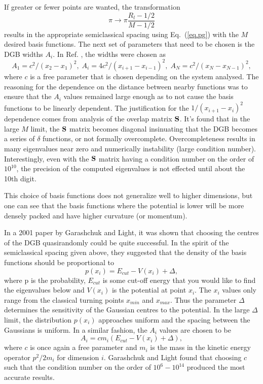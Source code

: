 { 
If greater or fewer points are wanted, the transformation 
 \begin{equation}
\label{eq.b6}
\pi \rightarrow \pi\dfrac{R_l-1/2}{M-1/2}
 \end{equation}  
 results in the appropriate semiclassical spacing using Eq.~(\ref{eq.pg}) with the $M$ desired basis functions.  The next set of parameters that need to be chosen is the DGB widths $A_i$.  In Ref. , the widths were chosen as
\begin{equation}\label{eq.ai}
A_1=c^2/\left(x_2-x_1\right)^2,\;A_i=4c^2/\left(x_{i+1}-x_{i-1}\right)^2,\;A_N=c^2/\left(x_N-x_{N-1}\right)^2,
\end{equation}
where $c$ is a free parameter that is chosen depending on the system analysed.  The reasoning for the dependence on the distance between nearby functions was to ensure that the $A_i$ values remained large enough as to not cause the basis functions to be linearly dependent.  The justification for the $1/\left(x_{i+1}-x_{i}\right)^2$ dependence comes from analysis of the overlap matrix ${{\bf S}}$. It's found that in the large $M$ limit, the ${{\bf S}}$ matrix becomes diagonal insinuating that the DGB becomes a series of $\delta$ functions, or not formally overcomplete.  Overcompleteness results in many eigenvalues near zero and numerically instability (large condition number).  Interestingly, even with the ${{\bf S}}$  matrix having a condition number on the order of $10^{10}$, the precision of the computed eigenvalues is not effected until about the 10th digit. 

This choice of basis functions does not generalize well to higher dimensions, but one can see that the basis functions where the potential is lower will be more densely packed and have higher curvature (or momentum).


  In a 2001 paper by Garashchuk and Light\cite{Garashchuk2001}, it was shown that choosing the centres of the DGB quasirandomly could be quite successful.  In the spirit of the semiclassical spacing given above, they suggested that the density of the basis functions should be proportional to 
\begin{equation}\label{eq.pprob}
p\left(x_i\right)=E_{cut}-V\left(x_i\right)+\Delta,
\end{equation}   
where p is the probability, $E_{cut}$ is some cut-off energy that you would like to find the eigenvalues below and $V\left(x_i\right)$ is the potential at point $x_i$. The $x_i$ values only range from the classical turning points $x_{min}$ and $x_{max}$.  Thus the parameter $\Delta$ determines the sensitivity of the Gaussian centres to the potential.  In the large $\Delta$ limit, the distribution $p\left(x_i\right)$ approaches uniform and the spacing between the Gaussians is uniform.  In a similar fashion, the $A_i$ values are chosen to be
\begin{equation}
A_i=c m_i\left(E_{cut} -V\left(x_i\right)+\Delta\right),
\end{equation}
where $c$ is once again a free parameter and $m_i$ is the mass in the kinetic energy operator $p^2/2m_i$ for dimension $i$.  Garashchuk and Light found that choosing $c$ such that the condition number on the order of $10^6-10^{14}$ produced the most accurate results.  
 
}
